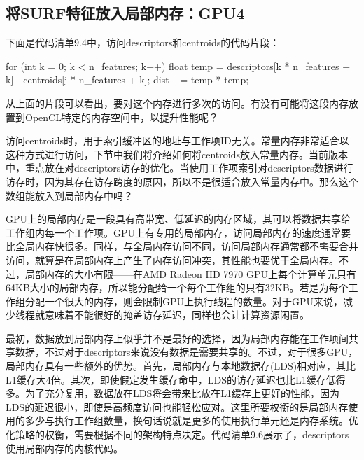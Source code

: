 \subsection{将SURF特征放入局部内存：GPU4}

下面是代码清单9.4中，访问descriptors和centroids的代码片段：

\begin{codebox}[cpp]
for (int k = 0; k < n_features; k++){
  float temp = descriptors[k * n_features + k] -
    centroids[j * n_features + k];
  dist += temp * temp;
}
\end{codebox}

从上面的片段可以看出，要对这个内存进行多次的访问。有没有可能将这段内存放置到OpenCL特定的内存空间中，以提升性能呢？

访问centroids时，用于索引缓冲区的地址与工作项ID无关。常量内存非常适合以这种方式进行访问，下节中我们将介绍如何将centroids放入常量内存。当前版本中，重点放在对descriptors访存的优化。当使用工作项索引对descriptors数据进行访存时，因为其存在访存跨度的原因，所以不是很适合放入常量内存中。那么这个数组能放入到局部内存中吗？

GPU上的局部内存是一段具有高带宽、低延迟的内存区域，其可以将数据共享给工作组内每一个工作项。GPU上有专用的局部内存，访问局部内存的速度通常要比全局内存快很多。同样，与全局内存访问不同，访问局部内存通常都不需要合并访问，就算是在局部内存上产生了内存访问冲突，其性能也要优于全局内存。不过，局部内存的大小有限——在AMD Radeon HD 7970 GPU上每个计算单元只有64KB大小的局部内存，所以能分配给一个每个工作组的只有32KB。若是为每个工作组分配一个很大的内存，则会限制GPU上执行线程的数量。对于GPU来说，减少线程就意味着不能很好的掩盖访存延迟，同样也会让计算资源闲置。

最初，数据放到局部内存上似乎并不是最好的选择，因为局部内存能在工作项间共享数据，不过对于descriptors来说没有数据是需要共享的。不过，对于很多GPU，局部内存具有一些额外的优势。首先，局部内存与本地数据存(LDS)相对应，其比L1缓存大4倍。其次，即使假定发生缓存命中，LDS的访存延迟也比L1缓存低得多。为了充分复用，数据放在LDS将会带来比放在L1缓存上更好的性能，因为LDS的延迟很小，即使是高频度访问也能轻松应对。这里所要权衡的是局部内存使用的多少与执行工作组数量，换句话说就是更多的使用执行单元还是内存系统。优化策略的权衡，需要根据不同的架构特点决定。代码清单9.6展示了，descriptors使用局部内存的内核代码。

